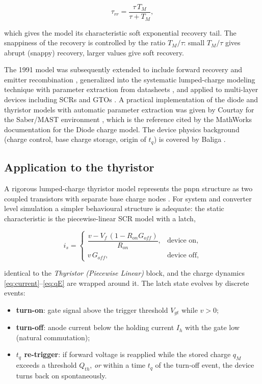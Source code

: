 \documentclass[11pt,a4paper]{article}
\begin{document}
\begin{equation}
  \tau_{rr} = \frac{\tau\, T_M}{\tau + T_M},
\end{equation}

which gives the model its characteristic soft exponential recovery tail. The
snappiness of the recovery is controlled by the ratio $T_M/\tau$: small
$T_M/\tau$ gives abrupt (snappy) recovery, larger values give soft recovery.

The 1991 model was subsequently extended to include forward recovery and
emitter recombination \cite{ma1993}, generalized into the systematic
lumped-charge modeling technique with parameter extraction from datasheets
\cite{ma1997}, and applied to multi-layer devices including SCRs and GTOs
\cite{ma1994}. A practical implementation of the diode and thyristor models
with automatic parameter extraction was given by Courtay for the Saber/MAST
environment \cite{courtay1995}, which is the reference cited by the MathWorks
documentation for the Diode charge model. The device physics background
(charge control, base charge storage, origin of $t_q$) is covered by Baliga
\cite{baliga2019}.

\subsection{Application to the thyristor}

A rigorous lumped-charge thyristor model represents the pnpn structure as two
coupled transistors with separate base charge nodes \cite{ma1994}. For system
and converter level simulation a simpler behavioural structure is adequate:
the static characteristic is the piecewise-linear SCR model with a latch,

\begin{equation}
  i_s =
  \begin{cases}
    \dfrac{v - V_f\,(1 - R_{on} G_{off})}{R_{on}}, & \text{device on},\\[2ex]
    v\, G_{off}, & \text{device off},
  \end{cases}
  \label{eq:pwl}
\end{equation}

identical to the \emph{Thyristor (Piecewise Linear)} block, and the charge
dynamics \eqref{eq:current}--\eqref{eq:qE} are wrapped around it. The latch
state evolves by discrete events:

\begin{itemize}
  \item \textbf{turn-on}: gate signal above the trigger threshold $V_{gt}$
        while $v > 0$;
  \item \textbf{turn-off}: anode current below the holding current $I_h$ with
        the gate low (natural commutation);
  \item \textbf{$t_q$ re-trigger}: if forward voltage is reapplied while the
        stored charge $q_M$ exceeds a threshold $Q_{th}$, \emph{or} within a
        time $t_q$ of the turn-off event, the device turns back on
        spontaneously.
\end{itemize}
\end{document}
